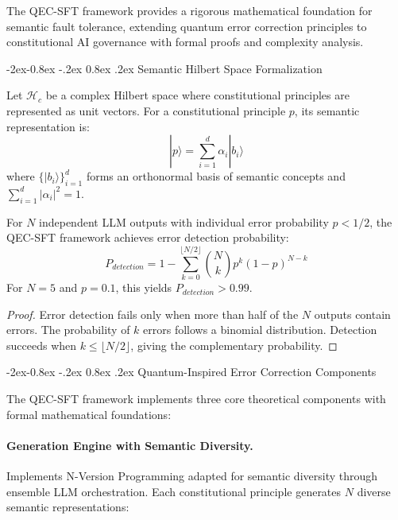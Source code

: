 \documentclass[manuscript,screen,9pt]{acmart}
\makeatletter
\renewcommand\subsubsection{\@startsection{subsubsection}{3}{\z@}%
  {-2ex\@plus -0.8ex \@minus -.2ex}%
  {0.8ex \@plus .2ex}%
  {\normalfont\normalsize\bfseries}}
\makeatother
\begin{document}
The QEC-SFT framework provides a rigorous mathematical foundation for semantic fault tolerance, extending quantum error correction principles to constitutional AI governance with formal proofs and complexity analysis.

\subsubsection{Semantic Hilbert Space Formalization}

\begin{definition}
Let $\mathcal{H}_c$ be a complex Hilbert space where constitutional principles are represented as unit vectors. For a constitutional principle $p$, its semantic representation is:
$$|p\rangle = \sum_{i=1}^{d} \alpha_i |b_i\rangle$$
where $\{|b_i\rangle\}_{i=1}^d$ forms an orthonormal basis of semantic concepts and $\sum_{i=1}^d |\alpha_i|^2 = 1$.
\end{definition}

\begin{theorem}
For $N$ independent LLM outputs with individual error probability $p < 1/2$, the QEC-SFT framework achieves error detection probability:
$$P_{detection} = 1 - \sum_{k=0}^{\lfloor N/2 \rfloor} \binom{N}{k} p^k (1-p)^{N-k}$$
For $N = 5$ and $p = 0.1$, this yields $P_{detection} > 0.99$.
\end{theorem}

\begin{proof}
Error detection fails only when more than half of the $N$ outputs contain errors. The probability of $k$ errors follows a binomial distribution. Detection succeeds when $k \leq \lfloor N/2 \rfloor$, giving the complementary probability.
\end{proof}

\subsubsection{Quantum-Inspired Error Correction Components}

The QEC-SFT framework implements three core theoretical components with formal mathematical foundations:

\paragraph{Generation Engine with Semantic Diversity.} Implements N-Version Programming adapted for semantic diversity through ensemble LLM orchestration. Each constitutional principle generates $N$ diverse semantic representations:
\end{document}
